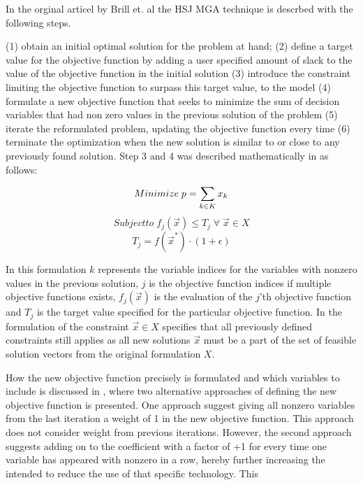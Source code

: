 In the orginal articel by Brill et. al \cite{Brill_MGA_1982} the HSJ MGA technique is descrbed with the following steps. 

(1) obtain an initial optimal solution for the problem at hand; (2) define a target value for the objective function by adding a user specified amount of slack to the value of the objective function in the initial solution (3) introduce the constraint limiting the objective function to surpass this target value, to the model (4) formulate a new objective function that seeks to minimize the sum of decision variables that had non zero values in the previous solution of the problem (5) iterate the reformulated problem, updating the objective function every time (6) terminate the optimization when the new solution is similar to or close to any previously found solution. Step 3 and 4 was described mathematically in \cite{Brill_MGA_1982} as follows:

\begin{equation}
Minimize \;  p = \sum_{k \in K} x_k \\
\end{equation}
\begin{equation}\label{eq:MGA_constraint}
Subject to \;  f_j(\vec{x}) \leq T_j \; \forall \;  \vec{x}\in X
\end{equation}
\begin{equation}
T_j =  f(\vec{x}^*) \cdot (1+\epsilon)
\end{equation}

In this formulation $k$ represents the variable indices for the variables with nonzero values in the previous solution, $j$ is the objective function indices if multiple objective functions exists, $f_j(\vec{x})$ is the evaluation of the $j$'th objective function and $T_j$ is the target value specified for the particular objective function. In the formulation of the constraint $\vec{x}\in X$ specifies that all previously defined constraints still applies as all new solutions $\vec{x}$ must be a part of the set of feasible solution vectors from the original formulation $X$.

How the new objective function precisely is formulated and which variables to include is discussed in \cite{DECAROLIS2016}, where two alternative approaches of defining the new objective function is presented. One approach suggest giving all nonzero variables from the last iteration a weight of 1 in the new objective function. This approach does not consider weight from previous iterations. However, the second approach suggests adding on to the coefficient with a factor of +1 for every time one variable has appeared with nonzero in a row, hereby further increasing the intended to reduce the use of that specific technology. This 

